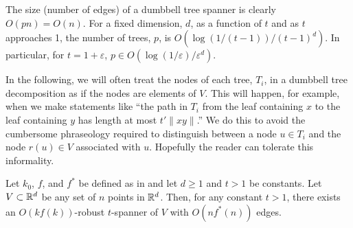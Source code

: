 \documentclass{patmorin}
\newcommand{\eps}{\varepsilon}
\begin{document}
The size (number of edges) of a dumbbell tree spanner is clearly
$O(pn)=O(n)$.  For a fixed dimension, $d$, as a function of $t$ and as $t$
approaches 1, the number of trees, $p$, is $O(\log(1/(t-1))/(t-1)^d)$.
In particular, for $t=1+\eps$, $p\in O(\log(1/\eps)/\eps^d)$.


In the following, we will often treat the nodes of each tree, $T_i$,
in a dumbbell tree decomposition as if the nodes are elements of $V$.
This will happen, for example, when we make statements like ``the path in
$T_i$ from the leaf containing $x$ to the leaf containing $y$ has length
at most $t'\|xy\|$.''  We do this to avoid the cumbersome phraseology
required to distinguish between a node $u\in T_i$ and the node $r(u)\in V$
associated with $u$.  Hopefully the reader can tolerate this informality.

\begin{thm}
  Let $k_0$, $f$, and $f^*$ be defined as in  and let
  $d\ge 1$ and $t>1$ be constants.  Let $V\subset \mathbb{R}^d$ be any set of
  $n$ points in $\mathbb{R}^d$.  Then, for any constant $t>1$,  there exists an
  $O(kf(k))$-robust $t$-spanner of $V$ with $O(nf^*(n))$ edges.
\end{thm}
\end{document}

